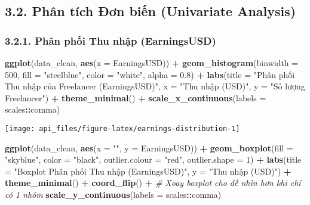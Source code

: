 \documentclass[
]{article}
\newenvironment{Shaded}{\begin{snugshade}}{\end{snugshade}}
\newcommand{\AttributeTok}[1]{\textcolor[rgb]{0.13,0.29,0.53}{#1}}
\newcommand{\CommentTok}[1]{\textcolor[rgb]{0.56,0.35,0.01}{\textit{#1}}}
\newcommand{\DecValTok}[1]{\textcolor[rgb]{0.00,0.00,0.81}{#1}}
\newcommand{\FloatTok}[1]{\textcolor[rgb]{0.00,0.00,0.81}{#1}}
\newcommand{\FunctionTok}[1]{\textcolor[rgb]{0.13,0.29,0.53}{\textbf{#1}}}
\newcommand{\NormalTok}[1]{#1}
\newcommand{\SpecialCharTok}[1]{\textcolor[rgb]{0.81,0.36,0.00}{\textbf{#1}}}
\newcommand{\StringTok}[1]{\textcolor[rgb]{0.31,0.60,0.02}{#1}}
\begin{document}
\subsection{3.2. Phân tích Đơn biến (Univariate
Analysis)}\label{phuxe2n-tuxedch-ux111ux1a1n-biux1ebfn-univariate-analysis}

\subsubsection{3.2.1. Phân phối Thu nhập
(EarningsUSD)}\label{phuxe2n-phux1ed1i-thu-nhux1eadp-earningsusd}

\begin{Shaded}
\begin{Highlighting}[]
\FunctionTok{ggplot}\NormalTok{(data\_clean, }\FunctionTok{aes}\NormalTok{(}\AttributeTok{x =}\NormalTok{ EarningsUSD)) }\SpecialCharTok{+}
  \FunctionTok{geom\_histogram}\NormalTok{(}\AttributeTok{binwidth =} \DecValTok{500}\NormalTok{, }\AttributeTok{fill =} \StringTok{"steelblue"}\NormalTok{, }\AttributeTok{color =} \StringTok{"white"}\NormalTok{, }\AttributeTok{alpha =} \FloatTok{0.8}\NormalTok{) }\SpecialCharTok{+}
  \FunctionTok{labs}\NormalTok{(}\AttributeTok{title =} \StringTok{"Phân phối Thu nhập của Freelancer (EarningsUSD)"}\NormalTok{,}
       \AttributeTok{x =} \StringTok{"Thu nhập (USD)"}\NormalTok{,}
       \AttributeTok{y =} \StringTok{"Số lượng Freelancer"}\NormalTok{) }\SpecialCharTok{+}
  \FunctionTok{theme\_minimal}\NormalTok{() }\SpecialCharTok{+}
  \FunctionTok{scale\_x\_continuous}\NormalTok{(}\AttributeTok{labels =}\NormalTok{ scales}\SpecialCharTok{::}\NormalTok{comma)}
\end{Highlighting}
\end{Shaded}

\begin{center}\texttt{[image: api\_files/figure-latex/earnings-distribution-1]} \end{center}

\begin{Shaded}
\begin{Highlighting}[]
\FunctionTok{ggplot}\NormalTok{(data\_clean, }\FunctionTok{aes}\NormalTok{(}\AttributeTok{x =} \StringTok{""}\NormalTok{, }\AttributeTok{y =}\NormalTok{ EarningsUSD)) }\SpecialCharTok{+}
  \FunctionTok{geom\_boxplot}\NormalTok{(}\AttributeTok{fill =} \StringTok{"skyblue"}\NormalTok{, }\AttributeTok{color =} \StringTok{"black"}\NormalTok{, }\AttributeTok{outlier.colour =} \StringTok{"red"}\NormalTok{, }\AttributeTok{outlier.shape =} \DecValTok{1}\NormalTok{) }\SpecialCharTok{+}
  \FunctionTok{labs}\NormalTok{(}\AttributeTok{title =} \StringTok{"Boxplot Phân phối Thu nhập (EarningsUSD)"}\NormalTok{,}
       \AttributeTok{y =} \StringTok{"Thu nhập (USD)"}\NormalTok{) }\SpecialCharTok{+}
  \FunctionTok{theme\_minimal}\NormalTok{() }\SpecialCharTok{+} 
  \FunctionTok{coord\_flip}\NormalTok{() }\SpecialCharTok{+} \CommentTok{\# Xoay boxplot cho dễ nhìn hơn khi chỉ có 1 nhóm}
  \FunctionTok{scale\_y\_continuous}\NormalTok{(}\AttributeTok{labels =}\NormalTok{ scales}\SpecialCharTok{::}\NormalTok{comma)}
\end{Highlighting}
\end{Shaded}
\end{document}
